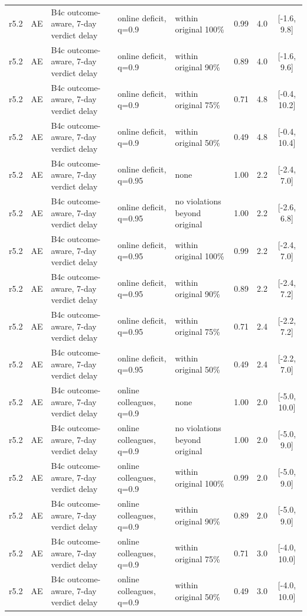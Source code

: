 \documentclass[10pt,onecolumn,letterpaper]{article}
\begin{document}
\begin{longtable}{lllp{4.2cm}p{3.4cm}ccc}
r5.2 & AE & B4c outcome-aware, 7-day verdict delay & online deficit, q=0.9 & within original 100\% & 0.99 & 4.0 & [-1.6, 9.8] \\
r5.2 & AE & B4c outcome-aware, 7-day verdict delay & online deficit, q=0.9 & within original 90\% & 0.89 & 4.0 & [-1.6, 9.6] \\
r5.2 & AE & B4c outcome-aware, 7-day verdict delay & online deficit, q=0.9 & within original 75\% & 0.71 & 4.8 & [-0.4, 10.2] \\
r5.2 & AE & B4c outcome-aware, 7-day verdict delay & online deficit, q=0.9 & within original 50\% & 0.49 & 4.8 & [-0.4, 10.4] \\
r5.2 & AE & B4c outcome-aware, 7-day verdict delay & online deficit, q=0.95 & none & 1.00 & 2.2 & [-2.4, 7.0] \\
r5.2 & AE & B4c outcome-aware, 7-day verdict delay & online deficit, q=0.95 & no violations beyond original & 1.00 & 2.2 & [-2.6, 6.8] \\
r5.2 & AE & B4c outcome-aware, 7-day verdict delay & online deficit, q=0.95 & within original 100\% & 0.99 & 2.2 & [-2.4, 7.0] \\
r5.2 & AE & B4c outcome-aware, 7-day verdict delay & online deficit, q=0.95 & within original 90\% & 0.89 & 2.2 & [-2.4, 7.2] \\
r5.2 & AE & B4c outcome-aware, 7-day verdict delay & online deficit, q=0.95 & within original 75\% & 0.71 & 2.4 & [-2.2, 7.2] \\
r5.2 & AE & B4c outcome-aware, 7-day verdict delay & online deficit, q=0.95 & within original 50\% & 0.49 & 2.4 & [-2.2, 7.0] \\
r5.2 & AE & B4c outcome-aware, 7-day verdict delay & online colleagues, q=0.9 & none & 1.00 & 2.0 & [-5.0, 10.0] \\
r5.2 & AE & B4c outcome-aware, 7-day verdict delay & online colleagues, q=0.9 & no violations beyond original & 1.00 & 2.0 & [-5.0, 9.0] \\
r5.2 & AE & B4c outcome-aware, 7-day verdict delay & online colleagues, q=0.9 & within original 100\% & 0.99 & 2.0 & [-5.0, 9.0] \\
r5.2 & AE & B4c outcome-aware, 7-day verdict delay & online colleagues, q=0.9 & within original 90\% & 0.89 & 2.0 & [-5.0, 9.0] \\
r5.2 & AE & B4c outcome-aware, 7-day verdict delay & online colleagues, q=0.9 & within original 75\% & 0.71 & 3.0 & [-4.0, 10.0] \\
r5.2 & AE & B4c outcome-aware, 7-day verdict delay & online colleagues, q=0.9 & within original 50\% & 0.49 & 3.0 & [-4.0, 10.0] \\

\end{longtable}
\end{document}
